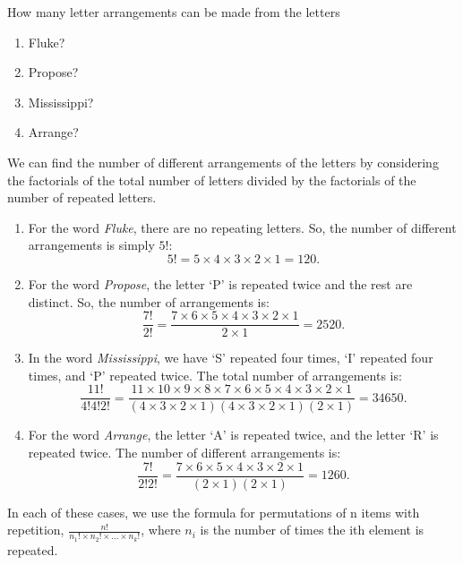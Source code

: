         \begin{exercise}
            How many letter arrangements can be made from the letters
            \begin{enumerate}[label=(\alph*)]
            \item Fluke?
            \item Propose?
            \item Mississippi?
            \item Arrange?
            \end{enumerate}
        \end{exercise}
        \begin{solution}
            We can find the number of different arrangements of the letters by considering the factorials of the total number of letters divided by the factorials of the number of repeated letters.
            
            \begin{enumerate}[label=(\alph*)]
            \item For the word \emph{Fluke}, there are no repeating letters. So, the number of different arrangements is simply \(5!\):
            \[ 5! = 5 \times 4 \times 3 \times 2 \times 1 = 120. \]
            
            \item For the word \emph{Propose}, the letter `P' is repeated twice and the rest are distinct. So, the number of arrangements is:
            \[ \frac{7!}{2!} = \frac{7 \times 6 \times 5 \times 4 \times 3 \times 2 \times 1}{2 \times 1} = 2520. \]
            
            \item In the word \emph{Mississippi}, we have `S' repeated four times, `I' repeated four times, and `P' repeated twice. The total number of arrangements is:
            \[ \frac{11!}{4!4!2!} = \frac{11 \times 10 \times 9 \times 8 \times 7 \times 6 \times 5 \times 4 \times 3 \times 2 \times 1}{(4 \times 3 \times 2 \times 1)(4 \times 3 \times 2 \times 1)(2 \times 1)} = 34650. \]
            
            \item For the word \emph{Arrange}, the letter `A' is repeated twice, and the letter `R' is repeated twice. The number of different arrangements is:
            \[ \frac{7!}{2!2!} = \frac{7 \times 6 \times 5 \times 4 \times 3 \times 2 \times 1}{(2 \times 1)(2 \times 1)} = 1260. \]
            \end{enumerate}
            In each of these cases, we use the formula for permutations of n items with repetition, \(\frac{n!}{n_1! \times n_2! \times \ldots \times n_k!}\), where \(n_i\) is the number of times the ith element is repeated.
        \end{solution}

